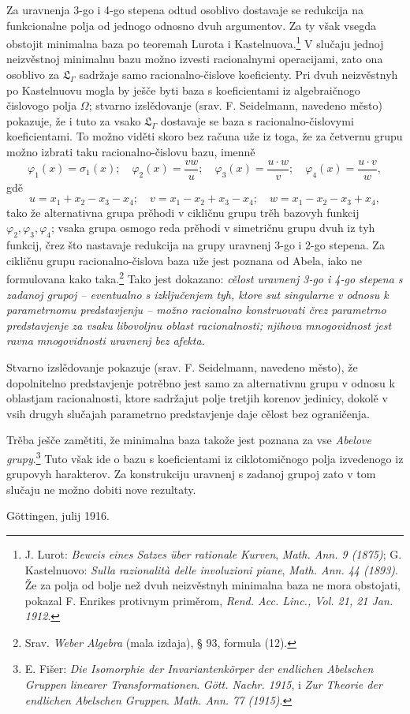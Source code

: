 \documentclass[11pt]{article}
\begin{document}
Za uravnenja 3-go i 4-go stepena odtud osoblivo dostavaje se redukcija na funkcionalne polja od jednogo odnosno dvuh argumentov. Za ty však vsegda obstojit minimalna baza po teoremah Lurota i Kastelnuova.\footnote{J. Lurot: \emph{Beweis eines Satzes über rationale Kurven}, \emph{Math. Ann. 9 (1875)}; G. Kastelnuovo: \emph{Sulla razionalità delle involuzioni piane}, \emph{Math. Ann. 44 (1893)}. Že za polja od bolje než dvuh neizvěstnyh minimalna baza ne mora obstojati, pokazal F. Enrikes protivnym priměrom, \emph{Rend. Acc. Linc., Vol. 21, 21 Jan. 1912}.} V slučaju jednoj neizvěstnoj minimalnu bazu možno izvesti racionalnymi operacijami, zato ona osoblivo za $\mathfrak L_\Gamma$ sadržaje samo racionalno-čislove koeficienty. Pri dvuh neizvěstnyh po Kastelnuovu mogla by ješče byti baza s koeficientami iz algebraičnogo čislovogo polja $\Omega$; stvarno izslědovanje (srav. F. Seidelmann, navedeno město) pokazuje, že i tuto za vsako $\mathfrak L_\Gamma$ dostavaje se baza s racionalno-čislovymi koeficientami. To možno viděti skoro bez računa uže iz toga, že za četvernu grupu možno izbrati taku racionalno-čislovu bazu, imenně
\[
\varphi_1(x)=\sigma_1(x);\quad \varphi_2(x)=\frac{v w}{u};\quad \varphi_3(x)=\frac{u\cdot w}{v};\quad \varphi_4(x)=\frac{u\cdot v}{w},
\]
gdě
\[
u=x_1+x_2-x_3-x_4;\quad v=x_1-x_2+x_3-x_4;\quad w=x_1-x_2-x_3+x_4,
\]
tako že alternativna grupa prěhodi v cikličnu grupu trěh bazovyh funkcij $\varphi_2,\varphi_3,\varphi_4$; vsaka grupa osmogo reda prěhodi v simetričnu grupu dvuh iz tyh funkcij, črez što nastavaje redukcija na grupy uravnenj 3-go i 2-go stepena. Za cikličnu grupu racionalno-čislova baza uže jest poznana od Abela, iako ne formulovana kako taka.\footnote{Srav. \emph{Weber Algebra} (mala izdaja), § 93, formula (12).} Tako jest dokazano: {\itshape cělost uravnenj 3-go i 4-go stepena s zadanoj grupoj -- eventualno s izključenjem tyh, ktore sut singularne v odnosu k parametrnomu predstavjenju -- možno racionalno konstruovati črez parametrno predstavjenje za vsaku libovoljnu oblast racionalnosti; njihova mnogovidnost jest ravna mnogovidnosti uravnenj bez afekta.}

Stvarno izslědovanje pokazuje (srav. F. Seidelmann, navedeno město), že dopolnitelno predstavjenje potrěbno jest samo za alternativnu grupu v odnosu k oblastjam racionalnosti, ktore sadržajut polje tretjih korenov jedinicy, dokolě v vsih drugyh slučajah parametrno predstavjenje daje cělost bez ograničenja.

Trěba ješče zamětiti, že minimalna baza takože jest poznana za vse {\itshape Abelove grupy}.\footnote{E. Fišer: \emph{Die Isomorphie der Invariantenkörper der endlichen Abelschen Gruppen linearer Transformationen}. \emph{Gött. Nachr. 1915}, i \emph{Zur Theorie der endlichen Abelschen Gruppen}. \emph{Math. Ann. 77 (1915)}.} Tuto však ide o bazu s koeficientami iz ciklotomičnogo polja izvedenogo iz grupovyh harakterov. Za konstrukciju uravnenj s zadanoj grupoj zato v tom slučaju ne možno dobiti nove rezultaty.

\mbox{Göttingen}, julij 1916.

\clearpage
\end{document}
